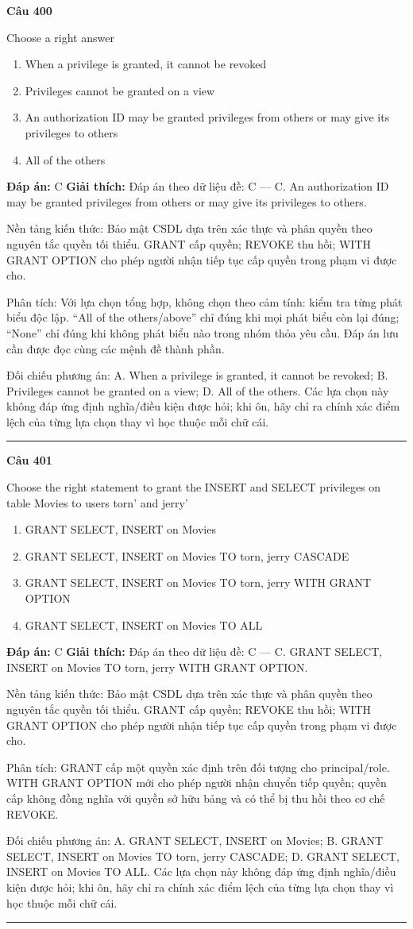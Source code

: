 \documentclass[11pt,a4paper]{article}
\newenvironment{question}[1]{%
  \par\vspace{1em}\noindent\textbf{\large Câu #1}\par\vspace{0.4em}
}{%
  \par\vspace{1em}\hrule\vspace{0.6em}
}
\newenvironment{choices}{%
  \begin{enumerate}[label=\textbf{\Alph*.},leftmargin=2.2em,itemsep=2pt,topsep=3pt]
}{%
  \end{enumerate}
}
\newcommand{\choice}{\item}
\begin{document}
\begin{question}{400}
Choose a right answer
\begin{choices}
\choice When a privilege is granted, it cannot be revoked
\choice Privileges cannot be granted on a view
\choice An authorization ID may be granted privileges from others or may give its privileges to others
\choice All of the others
\end{choices}
\textbf{Đáp án:} C
\textbf{Giải thích:} Đáp án theo dữ liệu đề: C — C. An authorization ID may be granted privileges from others or may give its privileges to others.

Nền tảng kiến thức: Bảo mật CSDL dựa trên xác thực và phân quyền theo nguyên tắc quyền tối thiểu. GRANT cấp quyền; REVOKE thu hồi; WITH GRANT OPTION cho phép người nhận tiếp tục cấp quyền trong phạm vi được cho.

Phân tích: Với lựa chọn tổng hợp, không chọn theo cảm tính: kiểm tra từng phát biểu độc lập. “All of the others/above” chỉ đúng khi mọi phát biểu còn lại đúng; “None” chỉ đúng khi không phát biểu nào trong nhóm thỏa yêu cầu. Đáp án lưu cần được đọc cùng các mệnh đề thành phần.

Đối chiếu phương án: A. When a privilege is granted, it cannot be revoked; B. Privileges cannot be granted on a view; D. All of the others. Các lựa chọn này không đáp ứng định nghĩa/điều kiện được hỏi; khi ôn, hãy chỉ ra chính xác điểm lệch của từng lựa chọn thay vì học thuộc mỗi chữ cái.
\end{question}

\begin{question}{401}
Choose the right statement to grant the INSERT and SELECT privileges on table Movies to users torn' and jerry'
\begin{choices}
\choice GRANT SELECT, INSERT on Movies
\choice GRANT SELECT, INSERT on Movies TO torn, jerry CASCADE
\choice GRANT SELECT, INSERT on Movies TO torn, jerry WITH GRANT OPTION
\choice GRANT SELECT, INSERT on Movies TO ALL
\end{choices}
\textbf{Đáp án:} C
\textbf{Giải thích:} Đáp án theo dữ liệu đề: C — C. GRANT SELECT, INSERT on Movies TO torn, jerry WITH GRANT OPTION.

Nền tảng kiến thức: Bảo mật CSDL dựa trên xác thực và phân quyền theo nguyên tắc quyền tối thiểu. GRANT cấp quyền; REVOKE thu hồi; WITH GRANT OPTION cho phép người nhận tiếp tục cấp quyền trong phạm vi được cho.

Phân tích: GRANT cấp một quyền xác định trên đối tượng cho principal/role. WITH GRANT OPTION mới cho phép người nhận chuyển tiếp quyền; quyền cấp không đồng nghĩa với quyền sở hữu bảng và có thể bị thu hồi theo cơ chế REVOKE.

Đối chiếu phương án: A. GRANT SELECT, INSERT on Movies; B. GRANT SELECT, INSERT on Movies TO torn, jerry CASCADE; D. GRANT SELECT, INSERT on Movies TO ALL. Các lựa chọn này không đáp ứng định nghĩa/điều kiện được hỏi; khi ôn, hãy chỉ ra chính xác điểm lệch của từng lựa chọn thay vì học thuộc mỗi chữ cái.
\end{question}
\end{document}
